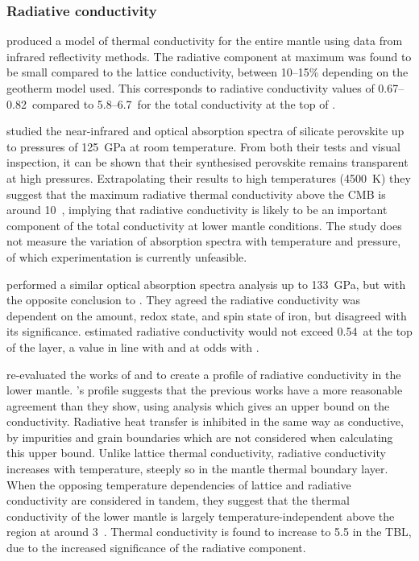 \subsubsection{Radiative conductivity}
\label{sec:rad_cond}

\citet{Hofmeister1999} produced a model of thermal conductivity for the entire mantle using data from infrared reflectivity methods. The radiative component at maximum was found to be small compared to the lattice conductivity, between 10--15\% depending on the geotherm model used. This corresponds to radiative conductivity values of 0.67--0.82~\wmks compared to 5.8--6.7~\wmks for the total conductivity at the top of \ddd.

\citet{Keppler2008} studied the near-infrared and optical absorption spectra of silicate perovskite up to pressures of 125~GPa at room temperature. From both their tests and visual inspection, it can be shown that their synthesised perovskite remains transparent at high pressures. Extrapolating their results to high temperatures (4500~K) they suggest that the maximum radiative thermal conductivity above the CMB is around 10~\wmk, implying that radiative conductivity is likely to be an important component of the total conductivity at lower mantle conditions. The study does not measure the variation of absorption spectra with temperature and pressure, of which experimentation is currently unfeasible.

\citet{Goncharov2008} performed a similar optical absorption spectra analysis up to 133~GPa, but with the opposite conclusion to \citet{Keppler2008}. They agreed the radiative conductivity was dependent on the amount, redox state, and spin state of iron, but disagreed with its significance. \citet{Goncharov2008} estimated radiative conductivity would not exceed 0.54~\wmks at the top of the \ddds layer, a value in line with \citet{Hofmeister1999} and at odds with \citet{Keppler2008}. 

\citet{Tang2014} re-evaluated the works of \citet{Keppler2008} and \citet{Goncharov2008} to create a profile of radiative conductivity in the lower mantle. \citeauthor{Tang2014}'s profile suggests that the previous works have a more reasonable agreement than they show, using analysis which gives an upper bound on the conductivity. Radiative heat transfer is inhibited in the same way as conductive, by impurities and grain boundaries which are not considered when calculating this upper bound. Unlike lattice thermal conductivity, radiative conductivity increases with temperature, steeply so in the mantle thermal boundary layer. When the opposing temperature dependencies of lattice and radiative conductivity are considered in tandem, they suggest that the thermal conductivity of the lower mantle is largely temperature-independent above the \ddds region at around 3~\wmk. Thermal conductivity is found to increase to 5.5 \wmks in the TBL, due to the increased significance of the radiative component.

